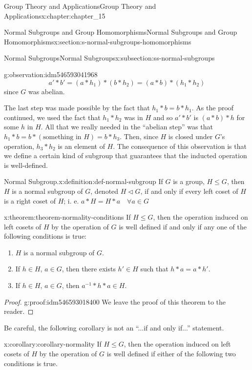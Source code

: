 \documentclass[oneside,10pt,]{book}
\numberwithin{equation}{section}
\begin{document}
\begin{chapterptx}{Group Theory and Applications}{}{Group Theory and Applications}{}{}{x:chapter:chapter_15}
\begin{sectionptx}{Normal Subgroups and Group Homomorphisms}{}{Normal Subgroups and Group Homomorphisms}{}{}{x:section:s-normal-subgroups-homomorphisms}
\begin{subsectionptx}{Normal Subgroups}{}{Normal Subgroups}{}{}{x:subsection:ss-normal-subgroups}
\begin{observation}{}{g:observation:idm546593041968}
\begin{equation*}
a'*b' = \left(a*h_1\right)*\left(b*h_2 \right) = (a*b)*\left(h_1*h_2\right)
\end{equation*}
since \(G\) was abelian.%
\par
The last step was made possible by the fact that \(h_1*b=b*h_1\). As the proof continued, we used the fact that \(h_1*h_2\) was in \(H\) and so \(a'*b'\) is \((a*b)*h\) for some \(h\) in \(H\). All that we really needed in the ``abelian step'' was that \(h_1*b = b*(\textrm{something in } H) = b*h_3\).  Then, since \(H\) is closed under \(G\)'s operation, \(h_3*h_2\) is an element of \(H\). The consequence of this observation is that we define a certain kind of subgroup that guarantees that the inducted operation is well-defined.%
\end{observation}
\begin{definition}{Normal Subgroup.}{x:definition:def-normal-subgroup}%
%
\label{g:notation:idm546593031872}%
If \(G\) is a group, \(H \leq  G\), then \(H\) is  a normal subgroup of  \(G\), denoted \(H \triangleleft  G\), if and only if every left coset  of \(H\) is a right coset of \(H\); i. e. \(a*H = H*a \quad \forall a \in G\)%
\end{definition}
\begin{theorem}{}{}{x:theorem:theorem-normality-conditions}%
If \(H \leq G\), then the operation induced on left cosets of \(H\) by the operation of \(G\) is well defined if and only if  any one of the following conditions is true:%
\begin{enumerate}[label=(\alph*)]
\item{}\(H\) is a normal subgroup of \(G\).%
\item{}If \(h \in  H\), \(a \in  G\), then there exists \(h' \in  H\) such that \(h*a = a*h'\).%
\item{}If \(h \in H\), \(a \in G\), then \(a^{-1}*h*a \in  H\).%
\end{enumerate}
%
\end{theorem}
\begin{proof}{}{g:proof:idm546593018400}
We leave the proof of this theorem to the reader.%
\end{proof}
Be careful, the following corollary is not an ``...if and only if...'' statement.%
\begin{corollary}{}{}{x:corollary:corollary-normality}%
If \(H \leq G\), then the operation induced on left cosets of \(H\) by the operation of \(G\) is well defined if either of the following two conditions is true.%

\end{corollary}
\end{subsectionptx}
\end{sectionptx}
\end{chapterptx}
\end{document}
